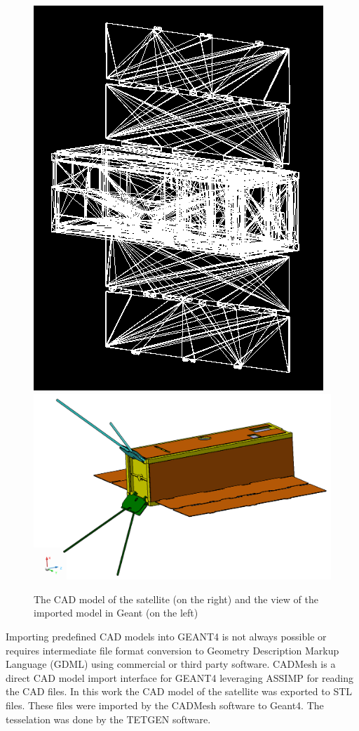 \documentclass[12pt, a4paper,titlepage]{article}
\numberwithin{equation}{section}
\numberwithin{figure}{section}
\begin{document}
\begin{figure}[h!]
 \centering %
 \includegraphics[width=.3\textwidth,origin=c,angle=0]{images/satellite.png}
 \qquad
 \includegraphics[width=.5\textwidth,origin=c,angle=90]{images/cad_sat.png} 
 \caption{\label{fig:i} The CAD model of the satellite (on the right) and the view of the imported model in Geant (on the left)}
 \end{figure}

Importing predefined CAD models into GEANT4 is not always possible or requires intermediate file format conversion to Geometry Description Markup Language (GDML) using commercial or third party software. CADMesh \cite{cadmesh} is a direct CAD model import interface for GEANT4 leveraging ASSIMP \cite{assimp} for reading the CAD files. In this work the CAD model of the satellite was exported to STL files. These files were imported by the CADMesh software to Geant4. The tesselation was done by the TETGEN \cite{tetgen} software.
\end{document}
